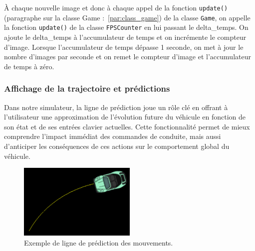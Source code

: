 À chaque nouvelle image et donc à chaque appel de la fonction \texttt{update()} (paragraphe sur la classe Game :~\ref{par:class_game}) de la classe \texttt{Game}, on appelle la fonction \texttt{update()} de la classe \texttt{FPSCounter} en lui passant le \gls{delta_temps}.
On ajoute le \gls{delta_temps} à l'accumulateur de temps et on incrémente le compteur d'image.
Lorsque l'accumulateur de temps dépasse 1 seconde, on met à jour le nombre d'images par seconde et on remet le compteur d'image et l'accumulateur de temps à zéro.

\subsubsection{Affichage de la trajectoire et prédictions}\label{subsubsec:affichage-de-la-trajectoire-et-predictions}
Dans notre simulateur, la ligne de prédiction joue un rôle clé en offrant à l'utilisateur une approximation de l'évolution future du véhicule en fonction de son état et de ses entrées clavier actuelles.
Cette fonctionnalité permet de mieux comprendre l'impact immédiat des commandes de conduite, mais aussi d'anticiper les conséquences de ces actions sur le comportement global du véhicule.

\begin{figure}[H]
    \centering
    \includegraphics[width=0.5\textwidth]{resources/example_prediction_line_1}
    \caption{Exemple de ligne de prédiction des mouvements.}
    \label{fig:prediction_line}
\end{figure}

